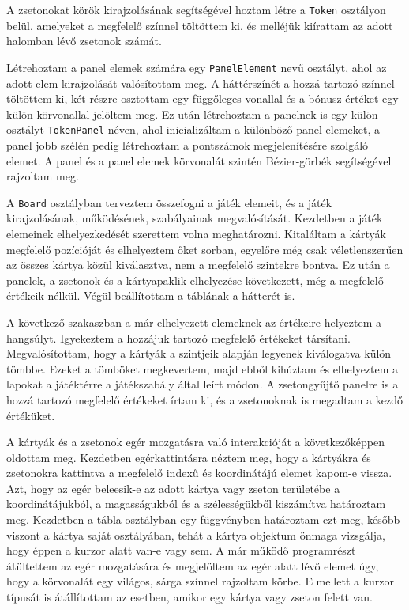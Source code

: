 
A zsetonokat körök kirajzolásának segítségével hoztam létre a \texttt{Token} osztályon belül, amelyeket a megfelelő színnel töltöttem ki, és melléjük kiírattam az adott halomban lévő zsetonok számát.


Létrehoztam a panel elemek számára egy \texttt{PanelElement} nevű osztályt, ahol az adott elem kirajzolását valósítottam meg. A háttérszínét a hozzá tartozó színnel töltöttem ki, két részre osztottam egy függőleges vonallal és a bónusz értéket egy külön körvonallal jelöltem meg. Ez után létrehoztam a panelnek is egy külön osztályt \texttt{TokenPanel} néven, ahol inicializáltam a különböző panel elemeket, a panel jobb szélén pedig létrehoztam a pontszámok megjelenítésére szolgáló elemet. A panel és a panel elemek körvonalát szintén Bézier-görbék segítségével rajzoltam meg.


A \texttt{Board} osztályban terveztem összefogni a játék elemeit, és a játék kirajzolásának, működésének, szabályainak megvalósítását. Kezdetben a játék elemeinek elhelyezkedését szerettem volna meghatározni. Kitaláltam a kártyák megfelelő pozícióját és elhelyeztem őket sorban, egyelőre még csak véletlenszerűen az összes kártya közül kiválasztva, nem a megfelelő szintekre bontva. Ez után a panelek, a zsetonok és a kártyapaklik elhelyezése következett, még a megfelelő értékeik nélkül. Végül beállítottam a táblának a hátterét is.

A következő szakaszban a már elhelyezett elemeknek az értékeire helyeztem a hangsúlyt. Igyekeztem a hozzájuk tartozó megfelelő értékeket társítani. Megvalósítottam, hogy a kártyák a szintjeik alapján legyenek kiválogatva külön tömbbe. Ezeket a tömböket megkevertem, majd ebből kihúztam és elhelyeztem a lapokat a játéktérre a játékszabály által leírt módon. A zsetongyűjtő panelre is a hozzá tartozó megfelelő értékeket írtam ki, és a zsetonoknak is megadtam a kezdő értéküket.


A kártyák és a zsetonok egér mozgatásra való interakcióját a következőképpen oldottam meg. Kezdetben egérkattintásra néztem meg, hogy a kártyákra és zsetonokra kattintva a megfelelő indexű és koordinátájú elemet kapom-e vissza. Azt, hogy az egér beleesik-e az adott kártya vagy zseton területébe a koordinátájukból, a magasságukból és a szélességükből kiszámítva határoztam meg. Kezdetben a tábla osztályban egy függvényben határoztam ezt meg, később viszont a kártya saját osztályában, tehát a kártya objektum önmaga vizsgálja, hogy éppen a kurzor alatt van-e vagy sem. A már működő programrészt átültettem az egér mozgatására és megjelöltem az egér alatt lévő elemet úgy, hogy a körvonalát egy világos, sárga színnel rajzoltam körbe. E mellett a kurzor típusát is átállítottam az esetben, amikor egy kártya vagy zseton felett van.

